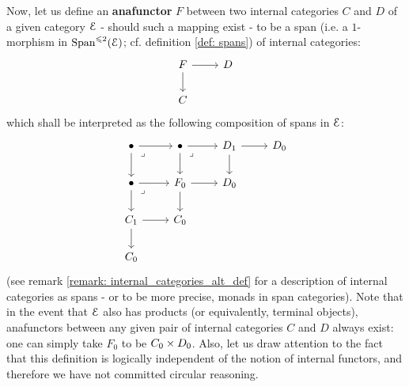 \begin{definition}
\begin{enumerate}
                        Now, let us define an \textbf{anafunctor} $F$ between two internal categories $C$ and $D$ of a given category $\mathcal{E}$ - should such a mapping exist - to be a span (i.e. a $1$-morphism in $\mathrm{Span}^{\leqslant 2}(\mathcal{E})$; cf. definition \ref{def: spans}) of internal categories:
                            $$
                                \begin{tikzcd}
                                	{F} & {D} \\
                                	{C}
                                	\arrow[from=1-1, to=2-1]
                                	\arrow[from=1-1, to=1-2]
                                \end{tikzcd}
                            $$
                        which shall be interpreted as the following composition of spans in $\mathcal{E}$:
                            $$
                                \begin{tikzcd}
                                	\bullet & \bullet & {D_1} & {D_0} \\
                                	\bullet & {F_0} & {D_0} \\
                                	{C_1} & {C_0} \\
                                	{C_0}
                                	\arrow[from=3-1, to=4-1]
                                	\arrow[from=3-1, to=3-2]
                                	\arrow[from=2-2, to=3-2]
                                	\arrow[from=2-2, to=2-3]
                                	\arrow[from=1-3, to=2-3]
                                	\arrow[from=1-3, to=1-4]
                                	\arrow[from=2-1, to=3-1]
                                	\arrow[from=2-1, to=2-2]
                                	\arrow[from=1-1, to=2-1]
                                	\arrow[from=1-1, to=1-2]
                                	\arrow[from=1-2, to=2-2]
                                	\arrow[from=1-2, to=1-3]
                                	\arrow["\lrcorner"{anchor=center, pos=0.125}, draw=none, from=1-2, to=2-3]
                                	\arrow["\lrcorner"{anchor=center, pos=0.125}, draw=none, from=1-1, to=2-2]
                                	\arrow["\lrcorner"{anchor=center, pos=0.125}, draw=none, from=2-1, to=3-2]
                                \end{tikzcd}
                            $$
                        (see remark \ref{remark: internal_categories_alt_def} for a description of internal categories as spans - or to be more precise, monads in span categories). Note that in the event that $\mathcal{E}$ also has products (or equivalently, terminal objects), anafunctors between any given pair of internal categories $C$ and $D$ always exist: one can simply take $F_0$ to be $C_0 \x D_0$. Also, let us draw attention to the fact that this definition is logically independent of the notion of internal functors, and therefore we have not committed circular reasoning.
                    \end{enumerate}
            \end{definition}
